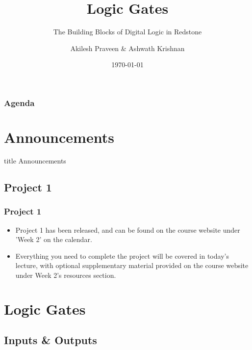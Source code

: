 \documentclass{beamer}
\title{Logic Gates}
\subtitle{The Building Blocks of Digital Logic in Redstone}
\author[A Praveen \& A Krishnan]{Akilesh Praveen \& Ashwath Krishnan}
\institute{UMD}
\date{\today}
\begin{document}
    \begin{frame}
        \titlepage
    \end{frame}
    
    \begin{frame}
        \frametitle{Agenda}
        \tableofcontents
    \end{frame}
    
    \section{Announcements}
    
        \begin{frame}
                \vfill
                \centering
                \begin{beamercolorbox}[sep=8pt,center,shadow=true,rounded=true]{title}
                    Announcements\par%
                \end{beamercolorbox}
                \vfill
             \end{frame}
    
        \subsection{Project 1}
        
            
            
            \begin{frame}
                \frametitle{Project 1}
                \begin{itemize}
                    \item Project 1 has been released, and can be found on the course website under 'Week 2' on the calendar.
                    \item Everything you need to complete the project will be covered in today's lecture, with optional supplementary material provided on the course website under Week 2's resources section.
                \end{itemize}
            \end{frame}
        
            
    \section{Logic Gates}
        \subsection{Inputs \& Outputs}
        
\end{document}
